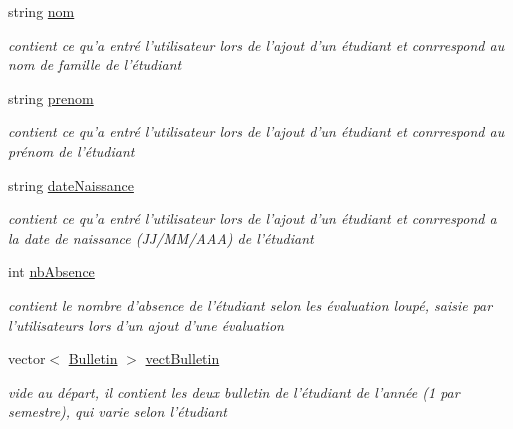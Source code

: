 \begin{DoxyCompactItemize}
\item 
\hypertarget{class_etudiant_a51185c35f25f27013812b897695e50cf}{string \hyperlink{class_etudiant_a51185c35f25f27013812b897695e50cf}{nom}}\label{class_etudiant_a51185c35f25f27013812b897695e50cf}

\begin{DoxyCompactList}\small\item\em contient ce qu'a entré l'utilisateur lors de l'ajout d'un étudiant et conrrespond au nom de famille de l'étudiant \end{DoxyCompactList}\item 
\hypertarget{class_etudiant_a014830eb28c8d8be56701df7141120b6}{string \hyperlink{class_etudiant_a014830eb28c8d8be56701df7141120b6}{prenom}}\label{class_etudiant_a014830eb28c8d8be56701df7141120b6}

\begin{DoxyCompactList}\small\item\em contient ce qu'a entré l'utilisateur lors de l'ajout d'un étudiant et conrrespond au prénom de l'étudiant \end{DoxyCompactList}\item 
\hypertarget{class_etudiant_ae0252be67ef5b4fcaf0180699913751b}{string \hyperlink{class_etudiant_ae0252be67ef5b4fcaf0180699913751b}{date\+Naissance}}\label{class_etudiant_ae0252be67ef5b4fcaf0180699913751b}

\begin{DoxyCompactList}\small\item\em contient ce qu'a entré l'utilisateur lors de l'ajout d'un étudiant et conrrespond a la date de naissance (J\+J/\+M\+M/\+A\+A\+A) de l'étudiant \end{DoxyCompactList}\item 
\hypertarget{class_etudiant_a16ed7b766d6a5f0e6cf476cc033ffe6e}{int \hyperlink{class_etudiant_a16ed7b766d6a5f0e6cf476cc033ffe6e}{nb\+Absence}}\label{class_etudiant_a16ed7b766d6a5f0e6cf476cc033ffe6e}

\begin{DoxyCompactList}\small\item\em contient le nombre d'absence de l'étudiant selon les évaluation loupé, saisie par l'utilisateurs lors d'un ajout d'une évaluation \end{DoxyCompactList}\item 
\hypertarget{class_etudiant_a11eda3a9ed55f23aab1357ac0d47ed26}{vector$<$ \hyperlink{class_bulletin}{Bulletin} $>$ \hyperlink{class_etudiant_a11eda3a9ed55f23aab1357ac0d47ed26}{vect\+Bulletin}}\label{class_etudiant_a11eda3a9ed55f23aab1357ac0d47ed26}

\begin{DoxyCompactList}\small\item\em vide au départ, il contient les deux bulletin de l'étudiant de l'année (1 par semestre), qui varie selon l'étudiant \end{DoxyCompactList}\end{DoxyCompactItemize}



